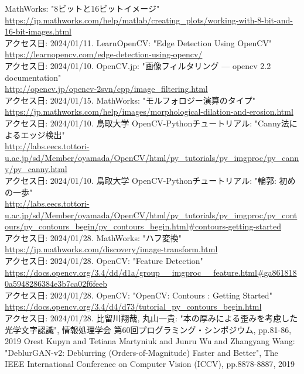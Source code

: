 \documentclass[uplatex, report, a4j, 10pt]{jsbook}
\begin{document}
\begin{thebibliography}{0}
  MathWorks: "8ビットと16ビットイメージ"\\\url{https://jp.mathworks.com/help/matlab/creating_plots/working-with-8-bit-and-16-bit-images.html}\\アクセス日: 2024/01/11.
  LearnOpenCV: "Edge Detection Using OpenCV"\\\url{https://learnopencv.com/edge-detection-using-opencv/}\\アクセス日: 2024/01/10.
  OpenCV.jp: "画像フィルタリング — opencv 2.2 documentation"\\\url{http://opencv.jp/opencv-2svn/cpp/image_filtering.html}\\アクセス日: 2024/01/15.
  MathWorks: "モルフォロジー演算のタイプ"\\\url{https://jp.mathworks.com/help/images/morphological-dilation-and-erosion.html}\\アクセス日: 2024/01/10.
  鳥取大学 OpenCV-Pythonチュートリアル: "Canny法によるエッジ検出"\\\url{http://labs.eecs.tottori-u.ac.jp/sd/Member/oyamada/OpenCV/html/py_tutorials/py_imgproc/py_canny/py_canny.html}\\アクセス日: 2024/01/10.
  鳥取大学 OpenCV-Pythonチュートリアル: "輪郭: 初めの一歩"\\\url{http://labs.eecs.tottori-u.ac.jp/sd/Member/oyamada/OpenCV/html/py_tutorials/py_imgproc/py_contours/py_contours_begin/py_contours_begin.html#contours-getting-started}\\アクセス日: 2024/01/28.
  MathWorks: "ハフ変換"\\\url{https://jp.mathworks.com/discovery/image-transform.html}\\アクセス日: 2024/01/28.
  OpenCV: "Feature Detection"\\\url{https://docs.opencv.org/3.4/dd/d1a/group__imgproc__feature.html#ga8618180a5948286384e3b7ca02f6feeb}\\アクセス日: 2024/01/28.
  OpenCV: "OpenCV: Contours : Getting Started"\\\url{https://docs.opencv.org/3.4/d4/d73/tutorial_py_contours_begin.html}\\アクセス日: 2024/01/28.
  比留川翔哉, 丸山一貴: "本の厚みによる歪みを考慮した光学文字認識", 情報処理学会 第60回プログラミング・シンポジウム, pp.81-86, 2019
  Orest Kupyn and Tetiana Martyniuk and Junru Wu and Zhangyang Wang: "DeblurGAN-v2: Deblurring (Orders-of-Magnitude) Faster and Better", The IEEE International Conference on Computer Vision (ICCV), pp.8878-8887, 2019

\end{thebibliography}
\end{document}
